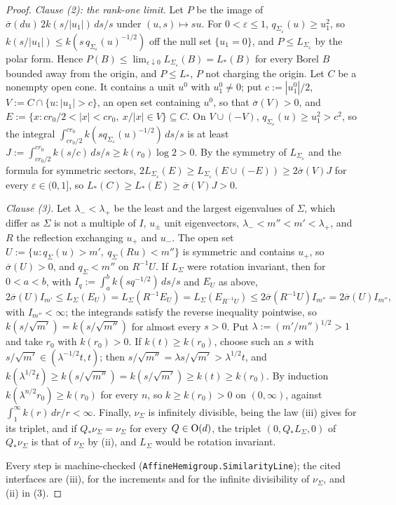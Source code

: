 \begin{proof}
\emph{Clause (2): the rank-one limit.} Let $P$ be the image of $\overline\sigma(du)\,2k(s/|u_1|)\,ds/s$ under
$(u,s) \mapsto su$. For $0 < \varepsilon \le 1$, $q_{\Sigma_\varepsilon}(u) \ge u_1^2$, so $k(s/|u_1|) \le
k(s\,q_{\Sigma_\varepsilon}(u)^{-1/2})$ off the null set $\{u_1 = 0\}$, and $P \le L_{\Sigma_\varepsilon}$ by the polar form. Hence
$P(B) \le \lim_{\varepsilon\downarrow0}L_{\Sigma_\varepsilon}(B) = L_*(B)$ for every Borel $B$ bounded away from the origin,
and $P \le L_*$, $P$ not charging the origin. Let $C$ be a nonempty open cone. It contains a unit $u^0$ with
$u^0_1 \ne 0$; put $c := |u^0_1|/2$, $V := C \cap \{u : |u_1| > c\}$, an open set containing $u^0$, so that
$\overline\sigma(V) > 0$, and $E := \{x : cr_0/2 < |x| < cr_0,\ x/|x| \in V\} \subseteq C$. On $V \cup (-V)$,
$q_{\Sigma_\varepsilon}(u) \ge u_1^2 > c^2$, so the integral $\int_{cr_0/2}^{cr_0}k(sq_{\Sigma_\varepsilon}(u)^{-1/2})\,ds/s$ is at least
$J := \int_{cr_0/2}^{cr_0}k(s/c)\,ds/s \ge k(r_0)\log 2 > 0$. By the symmetry of $L_{\Sigma_\varepsilon}$ and the formula for
symmetric sectors, $2L_{\Sigma_\varepsilon}(E) \ge L_{\Sigma_\varepsilon}(E \cup (-E)) \ge 2\overline\sigma(V)J$ for every
$\varepsilon \in (0,1]$, so $L_*(C) \ge L_*(E) \ge \overline\sigma(V)J > 0$.

\emph{Clause (3).} Let $\lambda_- < \lambda_+$ be the least and the largest eigenvalues of $\Sigma$, which differ as $\Sigma$ is
not a multiple of $I$, $u_\pm$ unit eigenvectors, $\lambda_- < m'' < m' < \lambda_+$, and $R$ the reflection exchanging $u_+$
and $u_-$. The open set $U := \{u : q_\Sigma(u) > m',\ q_\Sigma(Ru) < m''\}$ is symmetric and contains $u_+$, so
$\overline\sigma(U) > 0$, and $q_\Sigma < m''$ on $R^{-1}U$. If $L_\Sigma$ were rotation invariant, then for $0 < a < b$, with
$I_q := \int_a^bk(sq^{-1/2})\,ds/s$ and $E_U$ as above,
\[
  2\overline\sigma(U)I_{m'} \le L_\Sigma(E_U) = L_\Sigma(R^{-1}E_U) = L_\Sigma(E_{R^{-1}U}) \le 2\overline\sigma(R^{-1}U)I_{m''} = 2\overline\sigma(U)I_{m''} ,
\]
with $I_{m''} < \infty$; the integrands satisfy the reverse inequality pointwise, so $k(s/\sqrt{m'}) = k(s/\sqrt{m''})$ for
almost every $s > 0$. Put $\lambda := (m'/m'')^{1/2} > 1$ and take $r_0$ with $k(r_0) > 0$. If $k(t) \ge k(r_0)$, choose such
an $s$ with $s/\sqrt{m'} \in (\lambda^{-1/2}t, t)$; then $s/\sqrt{m''} = \lambda s/\sqrt{m'} > \lambda^{1/2}t$, and
$k(\lambda^{1/2}t) \ge k(s/\sqrt{m''}) = k(s/\sqrt{m'}) \ge k(t) \ge k(r_0)$. By induction $k(\lambda^{n/2}r_0) \ge k(r_0)$ for every
$n$, so $k \ge k(r_0) > 0$ on $(0,\infty)$, against $\int_1^\infty k(r)\,dr/r < \infty$. Finally, $\nu_\Sigma$ is infinitely
divisible, being the law (iii) gives for its triplet, and if $Q_*\nu_\Sigma = \nu_\Sigma$ for every
$Q \in \mathrm{O}(d)$, the triplet $(0, Q_*L_\Sigma, 0)$ of $Q_*\nu_\Sigma$ is that of $\nu_\Sigma$ by (ii), and $L_\Sigma$
would be rotation invariant.

Every step is machine-checked (\texttt{AffineHemigroup.SimilarityLine}); the cited interfaces are
(iii), for the increments and for the infinite divisibility of $\nu_\Sigma$, and (ii) in (3).
\end{proof}

